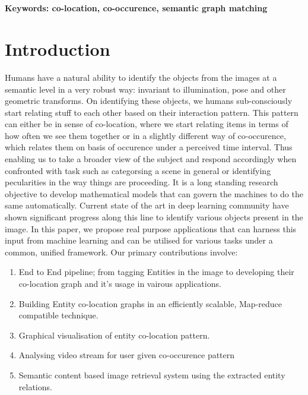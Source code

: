 \documentclass[conference]{IEEEtran}
\begin{document}
\\ \\
\textbf{Keywords: co-location, co-occurence, semantic graph matching}

%
\IEEEpeerreviewmaketitle



\section{Introduction}
Humans have a natural ability to identify the objects from the images at a semantic level in a very robust way: invariant to illumination, pose and other geometric transforms. On identifying these objects, we humans sub-consciously start relating stuff to each other based on their interaction pattern. This pattern can either be in sense of co-location, where we start relating items in terms of how often we see them together or in a slightly different way of co-occurence, which relates them on basis of occurence under a perceived time interval. Thus enabling us to take a broader view of the subject and respond accordingly when confronted with task such as categorsing a scene in general or identifying pecularities in the way things are proceeding. It is  a long standing research objective to develop mathematical models that can govern the machines to do the same automatically. Current state of the art in deep learning community have shown significant progress along this line to identify various objects present in the image. In this paper, we propose real purpose applications that can harness this input from machine learning and can be utilised for various tasks under a common, unified framework. Our primary contributions involve:
    \begin{enumerate}
        \item End to End pipeline; from tagging Entities in the image to developing their co-location graph and it's usage in vairous applications.
        \item Building Entity co-location graphs in an efficiently scalable, Map-reduce compatible technique.
        \item Graphical visualisation of entity co-location pattern.
        \item Analysing video stream for user given co-occurence pattern
        \item Semantic content based image retrieval system using the extracted entity relations.
    \end{enumerate}
\end{document}
